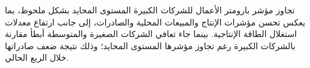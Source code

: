 تجاوز مؤشر بارومتر الأعمال للشركات الكبيرة المستوى المحايد بشكل ملحوظ، بما يعكس تحسن مؤشرات الإنتاج والمبيعات المحلية والصادرات، إلى جانب ارتفاع معدلات استغلال الطاقة الإنتاجية. بينما جاء تعافي الشركات الصغيرة والمتوسطة أبطأ مقارنة بالشركات الكبيرة رغم تجاوز مؤشرها المستوى المحايد؛ وذلك نتيجة ضعف صادراتها خلال الربع الحالي.
